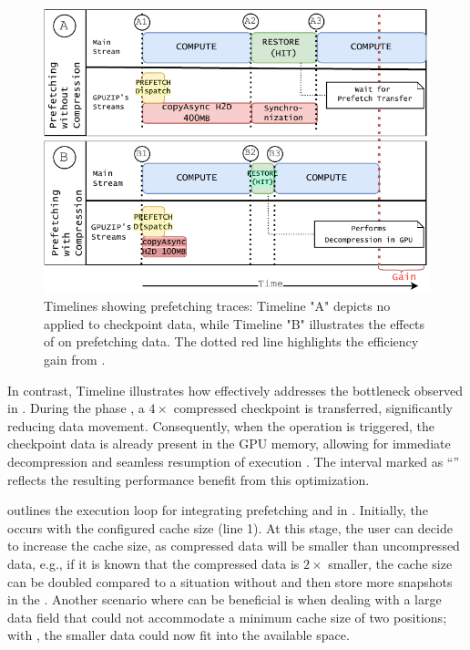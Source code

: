 \documentclass[Ingles,Final]{ic-tese-v3}
\begin{document}
\begin{figure}
  \centering
  \includegraphics[width=0.8\linewidth,trim={0 0 0 0},clip]{figures/async.pdf}
  \caption[Timeliness for \checkpointprefetching with and without \compression]{Timelines showing prefetching traces: Timeline "A" depicts no \compression applied to checkpoint data, while Timeline "B" illustrates the effects of \compression on prefetching data. The dotted red line highlights the efficiency gain from \compression.}
  \label{fig:async}
\end{figure}

In contrast, Timeline  illustrates how \compression effectively addresses the bottleneck observed in . During the  phase , a $4\times$ compressed checkpoint is transferred, significantly reducing \htd data movement. Consequently, when the \restore operation  is triggered, the checkpoint data is already present in the GPU memory, allowing for immediate decompression and seamless resumption of execution . The interval marked as ``'' reflects the resulting performance benefit from this optimization.

 outlines the execution loop for integrating prefetching and \compression in \awave. Initially, the  occurs with the configured cache size (line 1). At this stage, the user can decide to increase the cache size, as compressed data will be smaller than uncompressed data, e.g., if it is known that the compressed data is $2\times$ smaller, the cache size can be doubled compared to a situation without \compression and then store more snapshots in the \cache. Another scenario where \compression can be beneficial is when dealing with a large data field that could not accommodate a minimum cache size of two positions; with \compression, the smaller data could now fit into the available space.
\end{document}
